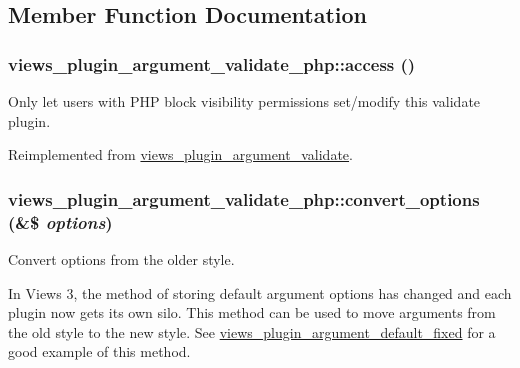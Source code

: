 \subsection{Member Function Documentation}
\hypertarget{classviews__plugin__argument__validate__php_a11100ee9f3e1d9ec27f3f1b151994d1c}{
\subsubsection[{access}]{\setlength{\rightskip}{0pt plus 5cm}views\_\-plugin\_\-argument\_\-validate\_\-php::access ()}}
\label{classviews__plugin__argument__validate__php_a11100ee9f3e1d9ec27f3f1b151994d1c}
Only let users with PHP block visibility permissions set/modify this validate plugin. 

Reimplemented from \hyperlink{classviews__plugin__argument__validate_ab90c095a5a91dcf8dfae02dc975d974e}{views\_\-plugin\_\-argument\_\-validate}.\hypertarget{classviews__plugin__argument__validate__php_a8e9620b1e226ad96a2796a313583bafe}{
\subsubsection[{convert\_\-options}]{\setlength{\rightskip}{0pt plus 5cm}views\_\-plugin\_\-argument\_\-validate\_\-php::convert\_\-options (\&\$ {\em options})}}
\label{classviews__plugin__argument__validate__php_a8e9620b1e226ad96a2796a313583bafe}
Convert options from the older style.

In Views 3, the method of storing default argument options has changed and each plugin now gets its own silo. This method can be used to move arguments from the old style to the new style. See \hyperlink{classviews__plugin__argument__default__fixed}{views\_\-plugin\_\-argument\_\-default\_\-fixed} for a good example of this method. 

